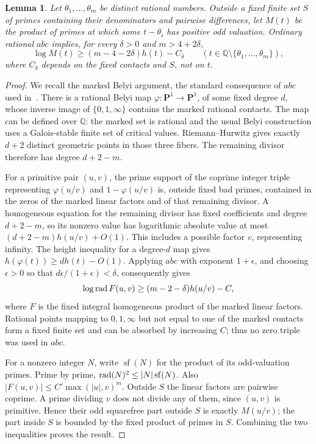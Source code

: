 \documentclass[11pt,a4paper]{article}
\newtheorem{lemma}[theorem]{Lemma}
\theoremstyle{remark}\newtheorem{remark}[theorem]{Remark}
\newcommand{\Q}{\mathbb Q}\newcommand{\Z}{\mathbb Z}
\begin{document}
\begin{lemma}\label{lem:marked}
Let $\theta_1,\ldots,\theta_m$ be distinct rational numbers. Outside a
fixed finite set $S$ of primes containing their denominators and pairwise
differences, let $M(t)$ be the product of primes at which some
$t-\theta_i$ has positive odd valuation. Ordinary rational $abc$ implies,
for every $\delta>0$ and $m>4+2\delta$,
\[
 \log M(t)\ge(m-4-2\delta)h(t)-C_\delta
 \qquad(t\in\Q\setminus\{\theta_1,\ldots,\theta_m\}),
\]
where $C_\delta$ depends on the fixed contacts and $S$, not on $t$.
\end{lemma}
\begin{proof}
We recall the marked Belyi argument, the standard consequence of $abc$
used in~\cite{Elkies}. There is a rational Belyi map
$\varphi:\mathbf P^1\to\mathbf P^1$, of some fixed degree $d$, whose
inverse image of $\{0,1,\infty\}$ contains the marked rational contacts.
The map can be defined over $\Q$: the marked set is rational and the
usual Belyi construction uses a Galois-stable finite set of critical
values. Riemann--Hurwitz gives exactly $d+2$ distinct geometric points
in those three fibers. The remaining divisor therefore has degree
$d+2-m$.

For a primitive pair $(u,v)$, the prime support of the coprime integer
triple representing $\varphi(u/v)$ and $1-\varphi(u/v)$ is, outside
fixed bad primes, contained in the zeros of the marked linear factors
and of that remaining divisor. A homogeneous equation for the remaining
divisor has fixed coefficients and degree $d+2-m$, so its nonzero value
has logarithmic absolute value at most $(d+2-m)h(u/v)+O(1)$.
This includes a possible factor $v$, representing infinity. The height
inequality for a degree-$d$ map gives $h(\varphi(t))\ge d h(t)-O(1)$.
Applying $abc$ with exponent $1+\epsilon$, and choosing $\epsilon>0$
so that $d\epsilon/(1+\epsilon)<\delta$, consequently gives
\[
 \log\operatorname{rad} F(u,v)\ge(m-2-\delta)h(u/v)-C,
\]
where $F$ is the fixed integral homogeneous product of the marked
linear factors. Rational points mapping to $0,1,\infty$ but not equal
to one of the marked contacts form a fixed finite set and can be
absorbed by increasing $C$; thus no zero triple was used in $abc$.

For a nonzero integer $N$, write $\operatorname{sf}(N)$ for the product
of its odd-valuation primes. Prime by prime,
$\operatorname{rad}(N)^2\le |N|\operatorname{sf}(N)$.
Also $|F(u,v)|\le C'\max(|u|,v)^m$. Outside $S$ the linear factors
are pairwise coprime. A prime dividing $v$ does not divide any of them,
since $(u,v)$ is primitive. Hence their odd squarefree part outside $S$
is exactly $M(u/v)$; the part inside $S$ is bounded by the fixed product
of primes in $S$. Combining the two inequalities proves the result.
\end{proof}
\end{document}

